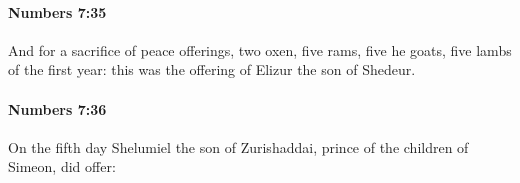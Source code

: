 		\paragraph{Numbers 7:35} %
			\label{NUMBERS-7-35}

			And for a sacrifice of peace offerings, two oxen, five rams, five he goats, five lambs of the first year: this was the offering of Elizur the son of Shedeur.


		\paragraph{Numbers 7:36} %
			\label{NUMBERS-7-36}

			On the fifth day Shelumiel the son of Zurishaddai, prince of the children of Simeon, did offer:


